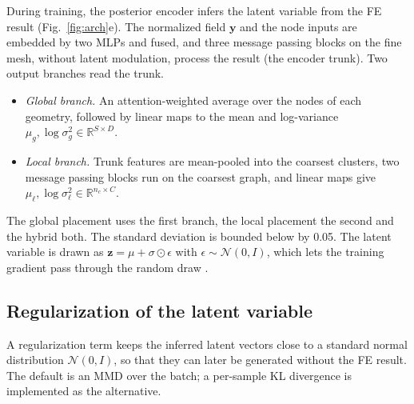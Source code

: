 \documentclass[preprint,12pt]{elsarticle}
\newcommand{\N}{\mathcal{N}}
\newcommand{\R}{\mathbb{R}}
\newcommand{\by}{\mathbf{y}}
\newcommand{\bz}{\mathbf{z}}
\begin{document}
During training, the posterior encoder infers the latent variable from the FE result (Fig.~\ref{fig:arch}e). The
normalized field $\by$ and the node inputs are embedded by two MLPs and fused, and three message
passing blocks on the fine mesh, without latent modulation, process the result (the encoder
trunk). Two output branches read the trunk.
\begin{itemize}
\item \emph{Global branch.} An attention-weighted average over the nodes of each geometry,
  followed by linear maps to the mean and log-variance $\mu_g,\log\sigma_g^2\in\R^{S\times D}$.
\item \emph{Local branch.} Trunk features are mean-pooled into the coarsest clusters, two message
  passing blocks run on the coarsest graph, and linear maps give
  $\mu_\ell,\log\sigma_\ell^2\in\R^{n_c\times C}$.
\end{itemize}
The global placement uses the first branch, the local placement the second and the hybrid both.
The standard deviation is bounded below by 0.05. The latent variable is drawn as
$\bz=\mu+\sigma\odot\epsilon$ with $\epsilon\sim\N(0,I)$, which lets the training gradient pass
through the random draw \cite{kingma2014vae}.

\subsection{Regularization of the latent variable}\label{sec:reg}

A regularization term keeps the inferred latent vectors close to a standard normal distribution
$\N(0,I)$, so that they can later be generated without the FE result. The default is an MMD over
the batch; a per-sample KL divergence is implemented as the alternative.
\end{document}
